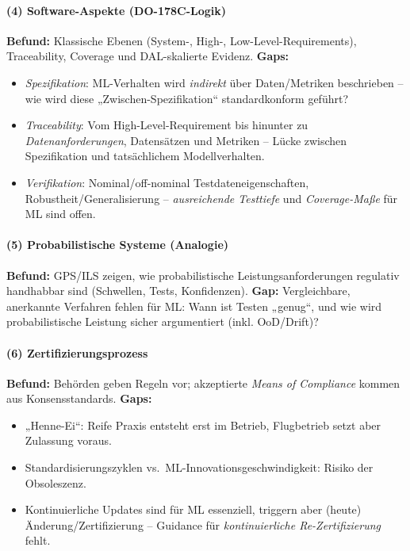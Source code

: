 \paragraph{(4) Software-Aspekte (DO-178C-Logik)}
\textbf{Befund:} Klassische Ebenen (System-, High-, Low-Level-Requirements), Traceability, Coverage und DAL-skalierte Evidenz.  
\textbf{Gaps:}
\begin{itemize}
  \item \textit{Spezifikation}: ML-Verhalten wird \emph{indirekt} über Daten/Metriken beschrieben – wie wird diese „Zwischen-Spezifikation“ standardkonform geführt?
  \item \textit{Traceability}: Vom High-Level-Requirement bis hinunter zu \emph{Datenanforderungen}, Datensätzen und Metriken – Lücke zwischen Spezifikation und tatsächlichem Modellverhalten.
  \item \textit{Verifikation}: Nominal/off-nominal Testdateneigenschaften, Robustheit/Generalisierung – \emph{ausreichende Testtiefe} und \emph{Coverage-Maße} für ML sind offen.
\end{itemize}

\paragraph{(5) Probabilistische Systeme (Analogie)}
\textbf{Befund:} GPS/ILS zeigen, wie probabilistische Leistungsanforderungen regulativ handhabbar sind (Schwellen, Tests, Konfidenzen).  
\textbf{Gap:} Vergleichbare, anerkannte Verfahren fehlen für ML: Wann ist Testen „genug“, und wie wird probabilistische Leistung sicher argumentiert (inkl. OoD/Drift)?

\paragraph{(6) Zertifizierungsprozess}
\textbf{Befund:} Behörden geben Regeln vor; akzeptierte \emph{Means of Compliance} kommen aus Konsensstandards.  
\textbf{Gaps:}
\begin{itemize}
  \item „Henne-Ei“: Reife Praxis entsteht erst im Betrieb, Flugbetrieb setzt aber Zulassung voraus.
  \item Standardisierungszyklen vs.\ ML-Innovationsgeschwindigkeit: Risiko der Obsoleszenz.
  \item Kontinuierliche Updates sind für ML essenziell, triggern aber (heute) Änderung/Zertifizierung – Guidance für \emph{kontinuierliche Re-Zertifizierung} fehlt.
\end{itemize}

